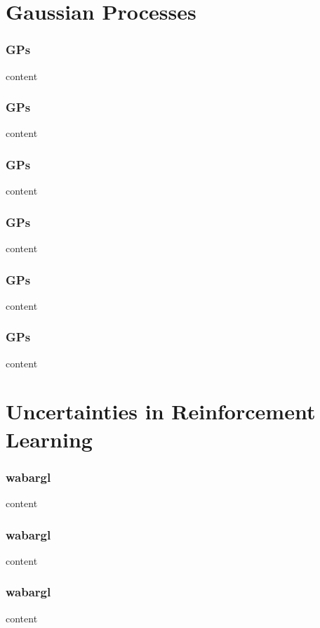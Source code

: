 \section{Gaussian Processes}
\begin{frame}
    \frametitle{GPs}

    content
\end{frame}
\begin{frame}
    \frametitle{GPs}

    content
\end{frame}
\begin{frame}
    \frametitle{GPs}

    content
\end{frame}
\begin{frame}
    \frametitle{GPs}

    content
\end{frame}
\begin{frame}
    \frametitle{GPs}

    content
\end{frame}
\begin{frame}
    \frametitle{GPs}

    content
\end{frame}

\section{Uncertainties in Reinforcement Learning}
\begin{frame}
    \frametitle{wabargl}

    content
\end{frame}
\begin{frame}
    \frametitle{wabargl}

    content
\end{frame}
\begin{frame}
    \frametitle{wabargl}

    content
\end{frame}


